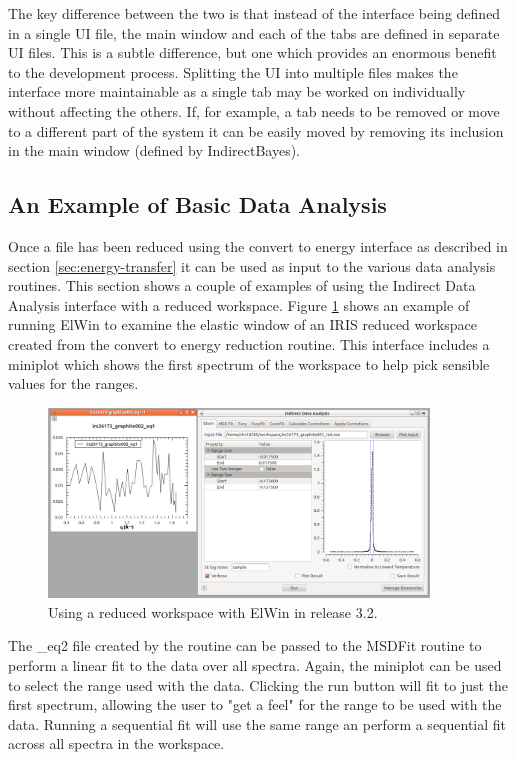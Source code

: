 \documentclass[paper=a4, fontsize=11pt]{scrartcl}	%
\numberwithin{equation}{section}															%
\numberwithin{figure}{section}																%
\numberwithin{table}{section}																%
\begin{document}
The key difference between the two is that instead of the interface being defined in a single UI file, the main window and each of the tabs are defined in separate UI files. This is a subtle difference, but one which provides an enormous benefit to the development process. Splitting the UI into multiple files makes the interface more maintainable as a single tab may be worked on individually without affecting the others. If, for example, a tab needs to be removed or move to a different part of the system it can be easily moved by removing its inclusion in the main window (defined by IndirectBayes).

\subsection{An Example of Basic Data Analysis}
Once a file has been reduced using the convert to energy interface as described in section \ref{sec:energy-transfer} it can be used as input to the various data analysis routines. This section shows a couple of examples of using the Indirect Data Analysis interface with a reduced workspace. Figure \ref{fig:iris-ida-elwin} shows an example of running ElWin to examine the elastic window of an IRIS reduced workspace created from the convert to energy reduction routine. This interface includes a miniplot which shows the first spectrum of the workspace to help pick sensible values for the ranges.

\begin{figure}[H]
\centering
\includegraphics[width=0.9\textwidth]{img/iris-ida-elwin.png}
\caption{Using a reduced workspace with ElWin in release 3.2.}
\label{fig:iris-ida-elwin}
\end{figure}

The \*\_eq2 file created by the routine can be passed to the MSDFit routine to perform a linear fit to the data over all spectra. Again, the miniplot can be used to select the range used with the data. Clicking the run button will fit to just the first spectrum, allowing the user to "get a feel" for the range to be used with the data. Running a sequential fit will use the same range an perform a sequential fit across all spectra in the workspace.
\end{document}
